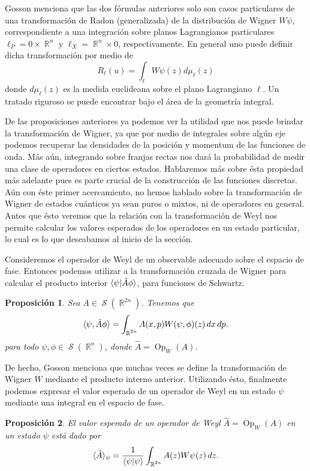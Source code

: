 \documentclass[a4paper]{report}
\DeclareMathOperator{\R}{\mathbb{R}}
\DeclareMathOperator{\Sz}{\mathcal S}
\DeclareMathOperator{\Op}{Op}
\newtheorem{proposition}{Proposición}
\begin{document}
  Gosson menciona que las dos fórmulas anteriores solo son
  casos particulares de una transformación de Radon
  (generalizada) de la distribución de Wigner $W\psi$,
  correspondiente a una integración sobre planos
  Lagrangianos particulares $\ell_P = 0 \times \R^{n}$ y
  $\ell_X = \R^{n} \times 0$, respectivamente. En general
  uno puede definir dicha transformación por medio de
  \[
    R_{\ell}(u)
    = \int_{\ell} W\psi(z) d\mu_{\ell}(z)
  \] 
  donde $d\mu_{\ell}(z)$ es la medida euclideana sobre el
  plano Lagrangiano $\ell$. Un tratado riguroso se puede
  encontrar bajo el área de la geometría integral.

  De las proposiciones anteriores ya podemos ver la utilidad
  que nos puede brindar la transformación de Wigner, ya que
  por medio de integrales sobre algún eje podemos recuperar
  las densidades de la posición y momentum de las funciones
  de onda. Más aún, integrando sobre franjas rectas nos dará
  la probabilidad de medir una clase de operadores en
  ciertos estados. Hablaremos más sobre ésta propiedad más
  adelante pues es parte crucial de la construcción de las
  funciones discretas. Aún con éste primer acercamiento, no
  hemos hablado sobre la transformación de Wigner de estados
  cuánticos ya sean puros o mixtos, ni de operadores en
  general.  Antes que ésto veremos que la relación con la
  transformación de Weyl nos permite calcular los valores
  esperados de los operadores en un estado particular, lo
  cual es lo que deseabamos al inicio de la sección.
  
  Consideremos el operador de Weyl de un observable adecuado
  sobre el espacio de fase. Entonces podemos utilizar a la
  transformación cruzada de Wigner para calcular el producto
  interior $\braket{\psi|\hat{A}\phi}$, para funciones de
  Schwartz.
  \begin{proposition}
    \label{prop:wigner-weyl}
    Sea $A \in \Sz(\R^{2n})$. Tenemos que
    \begin{equation}
      \braket{\psi, \hat{A}\phi}
      = \int_{\R^{2n}} A(x,p)W(\psi,\phi)(z) \, dx \, dp.
    \end{equation}
    para todo $\psi, \phi \in \Sz(\R^{n})$, donde $\hat{A} =
    \Op_W(A)$.
  \end{proposition}
  De hecho, Gosson menciona que muchas veces se define la
  transformación de Wigner $W$ mediante el producto interno
  anterior. Utilizando ésto, finalmente podemos expresar el
  valor esperado de un operador de Weyl en un estado $\psi$
  mediante una integral en el espacio de fase.
  \begin{proposition}
    El valor esperado de un operador de Weyl $\hat{A} =
    \Op_W(A)$ en un estado $\psi$ está dado por
    \begin{equation}
      \langle \hat{A} \rangle_\psi
      = \frac{1}{\braket{\psi|\psi}} 
      \int_{\R^{2n}} A(z) W\psi(z) \, dz.
    \end{equation}
  \end{proposition}  
\end{document}
